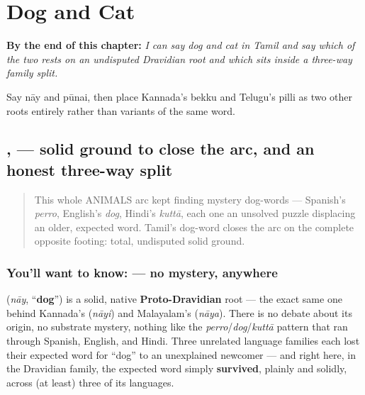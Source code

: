 
\chapter{Dog and Cat}
\label{ch:ta-dog-and-cat}

\begin{chapteropening}
\textbf{By the end of this chapter:} \emph{I can say dog and cat in Tamil and say which of the two rests on an undisputed Dravidian root and which sits inside a three-way family split.}

Say nāy and pūnai, then place Kannada's bekku and Telugu's pilli as two other roots entirely rather than variants of the same word.
\end{chapteropening}

\section[\texorpdfstring{\ta{நாய்}, \ta{பூனை} (nāy, pūnai)}{நாய், பூனை (nāy, pūnai)}]{,  — solid ground to close the arc, and an honest three-way split}

\label{lesson:TA-C21-naay-poonai}



\begin{quote}
This whole ANIMALS arc kept finding mystery dog-words — Spanish's \emph{perro}, English's \emph{dog}, Hindi's \emph{kuttā}, each one an unsolved puzzle displacing an older, expected word. Tamil's dog-word closes the arc on the complete opposite footing: total, undisputed solid ground.
\end{quote}

\subsection*{You'll want to know:  — no mystery, anywhere}
\textbf{} (\emph{nāy}, \textquotedblleft{}\textbf{dog}\textquotedblright{}) is a solid, native \textbf{Proto-Dravidian} root — the exact same one behind Kannada's \textbf{} (\emph{nāyi}) and Malayalam's \textbf{} (\emph{nāya}). There is no debate about its origin, no substrate mystery, nothing like the \emph{perro}/\emph{dog}/\emph{kuttā} pattern that ran through Spanish, English, and Hindi. Three unrelated language families each lost their expected word for \textquotedblleft{}dog\textquotedblright{} to an unexplained newcomer — and right here, in the Dravidian family, the expected word simply \textbf{survived}, plainly and solidly, across (at least) three of its languages.

